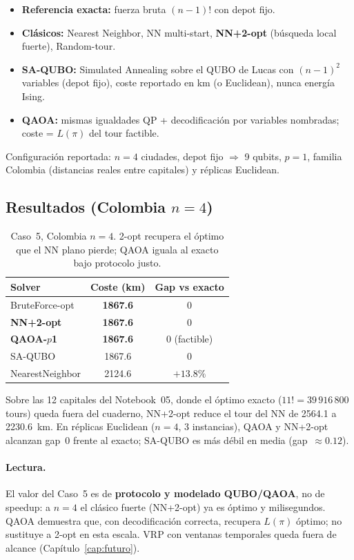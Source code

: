 \begin{itemize}
  \item \textbf{Referencia exacta:} fuerza bruta $(n-1)!$ con depot fijo.
  \item \textbf{Clásicos:} Nearest Neighbor, NN multi-start, \textbf{NN+2-opt} (búsqueda local fuerte), Random-tour.
  \item \textbf{SA-QUBO:} Simulated Annealing sobre el QUBO de Lucas con $(n-1)^2$ variables (depot fijo), coste reportado en km (o Euclidean), nunca energía Ising.
  \item \textbf{QAOA:} mismas igualdades QP + decodificación por variables nombradas; coste = $L(\pi)$ del tour factible.
\end{itemize}

Configuración reportada: $n=4$ ciudades, depot fijo $\Rightarrow$ 9 qubits, $p=1$, familia Colombia (distancias reales entre capitales) y réplicas Euclidean.

\subsection{Resultados (Colombia \texorpdfstring{$n=4$}{n=4})}

\begin{table}[ht]
\centering
\small
\begin{tabular}{lcc}
\hline
\textbf{Solver} & \textbf{Coste (km)} & \textbf{Gap vs exacto} \\
\hline
BruteForce-opt & \textbf{1867.6} & 0 \\
\textbf{NN+2-opt} & \textbf{1867.6} & 0 \\
\textbf{QAOA-$p$1} & \textbf{1867.6} & 0 (factible) \\
SA-QUBO & 1867.6 & 0 \\
NearestNeighbor & 2124.6 & $+13.8\%$ \\
\hline
\end{tabular}
\caption{Caso~5, Colombia $n=4$. 2-opt recupera el óptimo que el NN plano pierde; QAOA iguala al exacto bajo protocolo justo.}
\label{tab:tsp_colombia}
\end{table}

Sobre las 12 capitales del Notebook~05, donde el óptimo exacto ($11!=39\,916\,800$ tours) queda fuera del cuaderno, NN+2-opt reduce el tour del NN de 2564.1 a 2230.6~km. En réplicas Euclidean ($n=4$, 3 instancias), QAOA y NN+2-opt alcanzan gap~$0$ frente al exacto; SA-QUBO es más débil en media (gap~$\approx 0.12$).

\paragraph{Lectura.}
El valor del Caso~5 es de \textbf{protocolo y modelado QUBO/QAOA}, no de speedup: a $n=4$ el clásico fuerte (NN+2-opt) ya es óptimo y milisegundos. QAOA demuestra que, con decodificación correcta, recupera $L(\pi)$ óptimo; no sustituye a 2-opt en esta escala. VRP con ventanas temporales queda fuera de alcance (Capítulo~\ref{cap:futuro}).

